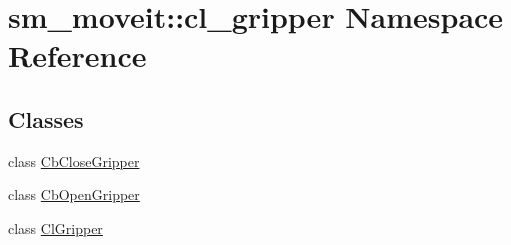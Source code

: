 \hypertarget{namespacesm__moveit_1_1cl__gripper}{}\section{sm\+\_\+moveit\+:\+:cl\+\_\+gripper Namespace Reference}
\label{namespacesm__moveit_1_1cl__gripper}
\subsection*{Classes}
\begin{DoxyCompactItemize}
\item 
class \hyperlink{classsm__moveit_1_1cl__gripper_1_1CbCloseGripper}{Cb\+Close\+Gripper}
\item 
class \hyperlink{classsm__moveit_1_1cl__gripper_1_1CbOpenGripper}{Cb\+Open\+Gripper}
\item 
class \hyperlink{classsm__moveit_1_1cl__gripper_1_1ClGripper}{Cl\+Gripper}
\end{DoxyCompactItemize}
